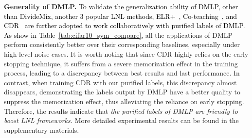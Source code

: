 \documentclass[10pt,twocolumn,letterpaper]{article}
\newcommand{\zbsN}[1]{\textcolor{black}{#1}}
\begin{document}
 \textbf{Generality of DMLP.} 
\zbsN{ To validate the generalization ability of DMLP, other than DivideMix, another 3 popular LNL methods, ELR+~\cite{2020ELR}, Co-teaching~\cite{Co-han2018co}, and CDR~\cite{2021CDR} are further adopted to work collaboratively with purified labels of DMLP. As show in  Table~\ref{tab:cifar10_sym_compare},}
all the applications of DMLP perform consistently better over their corresponding baselines, especially under high-level noise cases. 
It is worth noting that since CDR highly relies on the early stopping technique, it suffers from a severe memorization effect in the training process, leading to a discrepancy between best results and last performance. In contrast, when training CDR with our purified labels, this discrepancy almost disappears, demonstrating the labels output by DMLP have a better quality to suppress the memorization effect, thus alleviating the reliance on early stopping. Therefore, the results indicate that \emph{the purified labels of DMLP are friendly to boost LNL frameworks.} {More detailed experimental results can be found in the supplementary materials.}

 \begin{table}[!t]
\footnotesize
    \caption{
        Ablation study for the effectiveness of IPC and EAC in DMLP-Naive on CIFAR-10. } 
    \vspace{-1em}
    \centering 
    \vspace{-3mm}
    \label{tab:ablation} 
\end{table} 
 
\end{document}
